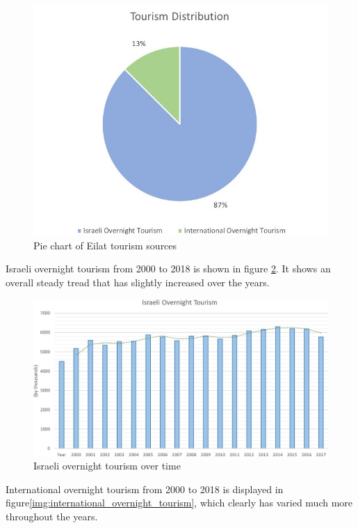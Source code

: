 \documentclass[12pt]{article}                       %
\begin{document}
\begin{figure}[H]
    \centering
    \includegraphics[width=12cm]{images/tourism_distribution.jpg}
    \caption{Pie chart of Eilat tourism sources}
    \label{img:tourism_sources}
\end{figure}
Israeli overnight tourism from 2000 to 2018 is shown in figure \ref{img:israeli_overnight_tourism}. It shows an overall steady tread that has slightly increased over the years. 

\begin{figure}[H]
    \centering
    \includegraphics[width=12cm]{images/israeli_overnight_tourism.jpg}
    \caption{Israeli overnight tourism over time}
    \label{img:israeli_overnight_tourism}
\end{figure}
International overnight tourism from 2000 to 2018 is displayed in figure\ref{img:international_overnight_tourism}, which clearly has varied much more throughout the years. 
\end{document}
